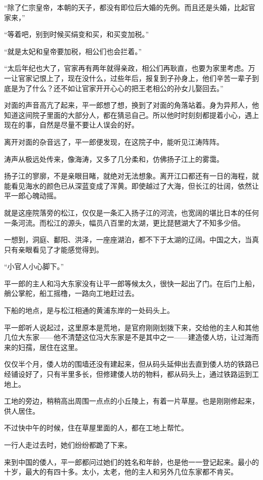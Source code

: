 “除了仁宗皇帝，本朝的天子，都没有即位后大婚的先例。而且还是头婚，比起官家来，”

“等着吧，别到时候买绢变和买，和买变加税。”

“就是太妃和皇帝要加税，相公们也会拦着。”

“太后年纪也大了，官家再有两年就得亲政，相公们再耿直，也要为家里考虑。万一让官家记恨上了，现在没什么，过些年后，报复到子孙身上，他们辛苦一辈子到底是为了什么？还不如让官家开开心心的把王老相公的孙女儿娶回去。”

对面的声音高亢了起来，平一郎想了想，换到了对面的角落站着。身为异邦人，他知道这间院子里面的大部分人，都在猜忌自己。所以他时时刻刻都提着小心，遇上现在的事，自然是尽量不要让人误会的好。

离开对面的杂音远了，平一郎便发现，在这院子中，能听见江涛阵阵。

涛声从极远处传来，像海涛，又多了几分柔和，仿佛扬子江上的雾霭。

扬子江的寥廓，不是亲眼目睹，就绝对无法想象。离开江口都还有一日的海程，就能看见海水的颜色已从深蓝变成了浑黄。即使越过了大海，但长江的壮阔，依然让平一郎心魄动摇。

就是这座院落旁的松江，仅仅是一条汇入扬子江的河流，也宽阔的堪比日本的任何一条河流。而松江的源头，幅员八百里的太湖，更比琵琶湖大了不知多少倍。

一想到，洞庭、鄱阳、洪泽，一座座湖泊，都不下于太湖的辽阔。中国之大，当真只有亲眼看见了才能感觉得到。

“小官人小心脚下。”

平一郎的主人和冯大东家没有让平一郎等候太久，很快一起出了门。在后门上船，艄公掌舵，船工摇橹，一路向工地赶过去。

下船的地点，是与松江相通的黄浦东岸的一处码头上。

平一郎听人说起过，这里原本是荒地，是官府刚刚划拨下来，交给他的主人和其他几位大东家——他不清楚这位冯大东家是不是其中之一——建造倭人坊，让过海而来的妇孺，居住在这里。

仅仅半个月，倭人坊的围墙还没有建起来，但从码头延伸出去直到倭人坊的铁路已经铺设好了，只有半里多长，但修建倭人坊的物料，都从码头上，通过铁路运到工地上。

工地的旁边，稍稍高出周围一点点的小丘陵上，有着一片草屋。也是刚刚修起来，供人居住。

不过快中午的时候，住在草屋里面的人，都在工地上帮忙。

一行人走过去时，她们纷纷都跪了下来。

来到中国的倭人，平一郎都问过她们的姓名和年龄，也是他一一登记起来。最小的十岁，最大的有四十多。太小，太老，他的主人和另外几位东家都不肯买。

